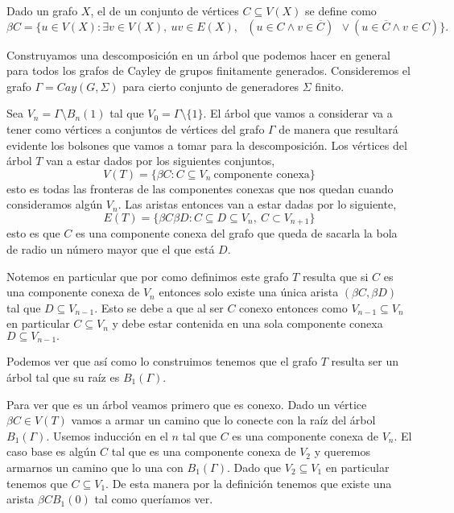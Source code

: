 \documentclass[tesis.tex]{subfiles}
\begin{document}
\begin{deff}
	Dado un grafo $X$, el  de un conjunto de vértices $C \subseteq V(X)$ se define como
	\[
	\beta C = \{ u \in V(X) : \exists v \in V(X), \ uv \in E(X), \  \ \ (u \in C \wedge v \in \overline C) \ \ \lor  (u \in \overline C \wedge v \in  C)   \}.
	\] 
\end{deff}

\begin{ej}\label{desc-grafo-cayley}%
	
	Construyamos una descomposición en un árbol que podemos hacer en general para todos los grafos de Cayley de grupos finitamente generados. 
	Consideremos el grafo $\Gamma = Cay(G,\Sigma)$ para cierto conjunto de generadores $\Sigma$ finito.
	
	Sea $V_n = \Gamma \setminus B_n(1) $ tal que $V_0 = \Gamma \setminus \{1\}$. 
	El árbol que vamos a considerar va a tener como vértices a conjuntos de vértices del grafo $\Gamma$ de manera que resultará evidente los bolsones que vamos a tomar para la descomposición. 
	Los vértices del árbol $T$ van a estar dados por los siguientes conjuntos,
	\[
	V(T) = \{  \beta C : C \subseteq V_n \ \text{componente conexa}   \}
	\]
	esto es todas las fronteras de las componentes conexas que nos quedan cuando consideramos algún $V_n$. 
	Las aristas entonces van a estar dadas por lo siguiente,
	\[
	E(T) = \{ \beta C \beta D : C \subseteq D \subseteq V_n, \ C \subset V_{n+1}   \}
	\]
	esto es que $C$ es una componente conexa del grafo que queda de sacarla la bola de radio un número mayor que el que está $D$.
	
	Notemos en particular que por como definimos este grafo $T$ resulta que si $C$ es una componente conexa de $V_n$ entonces solo existe una única arista $(\beta C, \beta D)$ tal que $D \subseteq V_{n-1}$. 
	Esto se debe a que al ser $C$ conexo entonces como $V_{n-1} \subseteq V_{n}$ en particular $C \subseteq V_{n}$ y debe estar contenida en una sola componente conexa $D \subseteq V_{n-1}.$
	
	
	Podemos ver que así como lo construimos tenemos que el grafo $T$ resulta ser un árbol tal que su raíz es $B_1(\Gamma)$. 
	
	Para ver que es un árbol veamos primero que es conexo. Dado un vértice $\beta C \in V(T)$ vamos a armar un camino que lo conecte con la raíz del árbol $B_1(\Gamma)$. 
	Usemos inducción en el $n$ tal que $C$ es una componente conexa de $V_n$. 
	El caso base es algún $C$ tal que es una componente conexa de $V_2$ y queremos armarnos un camino que lo una con $B_1(\Gamma)$. 
	Dado que $V_2 \subseteq V_1$ en particular tenemos que $C \subseteq V_1$. De esta manera por la definición tenemos que existe una arista $\beta CB_1(0)$ tal como queríamos ver.
	

\end{ej}
\end{document}
